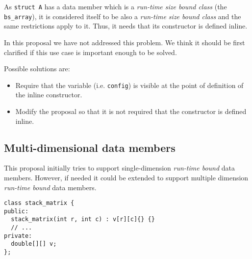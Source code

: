 As \verb+struct A+ has a data member which is a \emph{run-time size bound class}
(the \verb+bs_array+), it is considered itself to be also a \emph{run-time size
bound class} and the same restrictions apply to it. Thus, it needs that its
constructor is defined inline.

In this proposal we have not addressed this problem. We think it should be first
clarified if this use case is important enough to be solved.

Possible solutions are:

\begin{itemize}

\item Require that the variable (i.e. \verb+config+) is visible at the point of definition of the
inline constructor.

\item Modify the proposal so that it is not required that the constructor is
defined inline.

\end{itemize}

\subsection{Multi-dimensional data members}

This proposal initially tries to support single-dimension \emph{run-time bound}
data members. However, if needed it could be extended to support multiple
dimension \emph{run-time bound} data members.

\begin{lstlisting}
class stack_matrix {
public:
  stack_matrix(int r, int c) : v[r][c]{} {}
  // ...
private:
  double[][] v;
};
\end{lstlisting}

